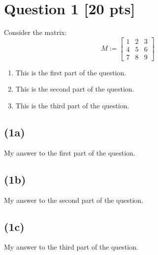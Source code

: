 \section*{Question 1 [20 pts]}

Consider the matrix:
$$M := \begin{bmatrix}
1 & 2 & 3 \\
4 & 5 & 6 \\
7 & 8 & 9
\end{bmatrix}$$

\begin{enumerate}[label=(\alph*)]
\item This is the first part of the question.
\item This is the second part of the question.
\item This is the third part of the question.
\end{enumerate}

\solidrule

\subsection*{(1a)}

My answer to the first part of the question.

\dotrule

\subsection*{(1b)}

My answer to the second part of the question.

\dotrule

\subsection*{(1c)}

My answer to the third part of the question.


\solidrule